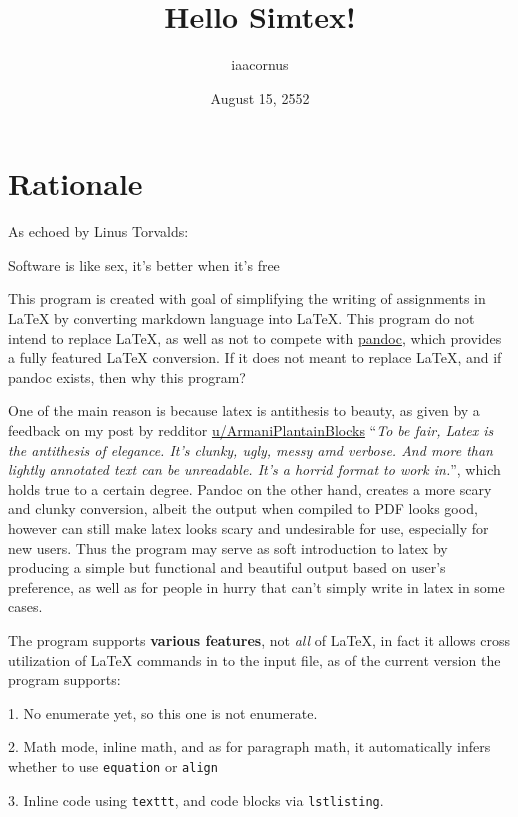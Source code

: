 \documentclass[12pt, UTF8]{article}
\title{Hello Simtex!}
\author{iaacornus}
\date{August 15, 2552}
\begin{document}
	\maketitle
	
	\section{Rationale}
	
	As echoed by Linus Torvalds:
	
	\begin{displayquote}
		Software is like sex, it's better when it's free
	\end{displayquote}
	
	This program is created with goal of simplifying the writing of assignments in \LaTeX{} by converting markdown language into \LaTeX{}. This program do not intend to replace \LaTeX{}, as well as not to compete with \href{https://pandoc.org/}{pandoc}, which provides a fully featured \LaTeX{} conversion. If it does not meant to replace \LaTeX{}, and if pandoc exists, then why this program?
	
	One of the main reason is because latex is antithesis to beauty, as given by a feedback on my post by redditor \href{https://www.reddit.com/user/ArmaniPlantainBlocks/}{u/ArmaniPlantainBlocks} ``\emph{To be fair, Latex is the antithesis of elegance. It's clunky, ugly, messy amd verbose. And more than lightly annotated text can be unreadable. It's a horrid format to work in.}'', which holds true to a certain degree. Pandoc on the other hand, creates a more scary and clunky conversion, albeit the output when compiled to PDF looks good, however can still make latex looks scary and undesirable for use, especially for new users. Thus the program may serve as soft introduction to latex by producing a simple but functional and beautiful output based on user's preference, as well as for people in hurry that can't simply write in latex in some cases.
	
	The program supports \textbf{various features}, not \textit{all} of \LaTeX{}, in fact it allows cross utilization of \LaTeX{} commands in to the input file, as of the current version the program supports:
	
	1. No enumerate yet, so this one is not enumerate.
	
	2. Math mode, inline math, and as for paragraph math, it automatically infers whether to use \texttt{equation} or \texttt{align}
	
	3. Inline code using \texttt{texttt{}}, and code blocks via \texttt{lstlisting}.
	
\end{document}
